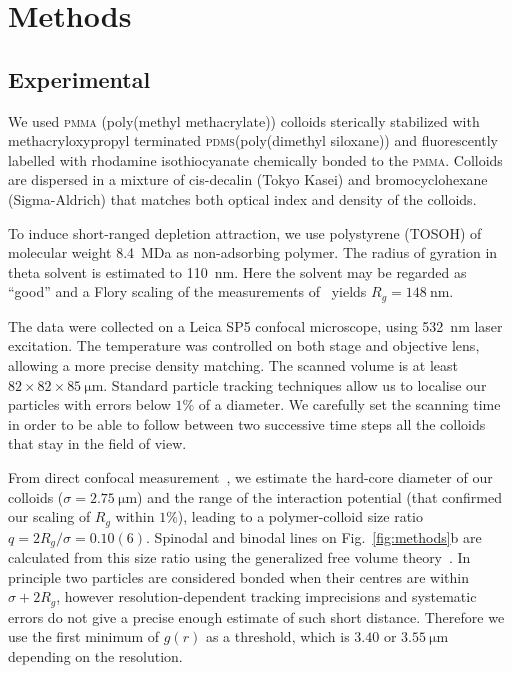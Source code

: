 \section*{Methods}

\subsection*{Experimental}

We used \textsc{pmma} (poly(methyl methacrylate)) colloids sterically stabilized with methacryloxypropyl terminated \textsc{pdms}(poly(dimethyl siloxane)) and fluorescently labelled with rhodamine isothiocyanate chemically bonded to the \textsc{pmma}. Colloids are dispersed in a mixture of cis-decalin (Tokyo Kasei) and bromocyclohexane (Sigma-Aldrich) that matches both optical index and density of the colloids.

To induce short-ranged depletion attraction, we use polystyrene (TOSOH) of molecular weight \SI{8.4}{\mega\dalton} as non-adsorbing polymer. The radius of gyration in theta solvent is estimated to \SI{110}{\nano\metre}. Here the solvent may be regarded as ``good'' and a Flory scaling of the measurements of~\cite{lu2008gelation} yields $R_g=\SI{148}{\nano\metre}$.

The data were collected on a Leica SP5 confocal microscope, using \SI{532}{\nano\metre} laser excitation. The temperature was controlled on both stage and objective lens, allowing a more precise density matching. The scanned volume is at least $82 \times 82 \times \SI{85}{\micro\metre}$. Standard particle tracking techniques allow us to localise our particles with errors below $1\%$ of a diameter. We carefully set the scanning time in order to be able to follow between two successive time steps all the colloids that stay in the field of view.

From direct confocal measurement~\cite{Royall2007, Poon2012}, we estimate the hard-core diameter of our colloids ($\sigma=\SI{2.75}{\micro\metre}$) and the range of the interaction potential (that confirmed our scaling of $R_g$ within $1\%$), leading to a polymer-colloid size ratio $q = 2R_g/\sigma = 0.10(6)$. Spinodal and binodal lines on Fig.~\ref{fig:methods}b are calculated from this size ratio using the generalized free volume theory~\cite{Fleer2008}. In principle two particles are considered bonded when their centres are within $\sigma+2R_g$, however resolution-dependent tracking imprecisions and systematic errors do not give a precise enough estimate of such short distance. Therefore we use the first minimum of $g(r)$ as a threshold, which is $3.40 \text{ or } \SI{3.55}{\micro\metre}$ depending on the resolution.

